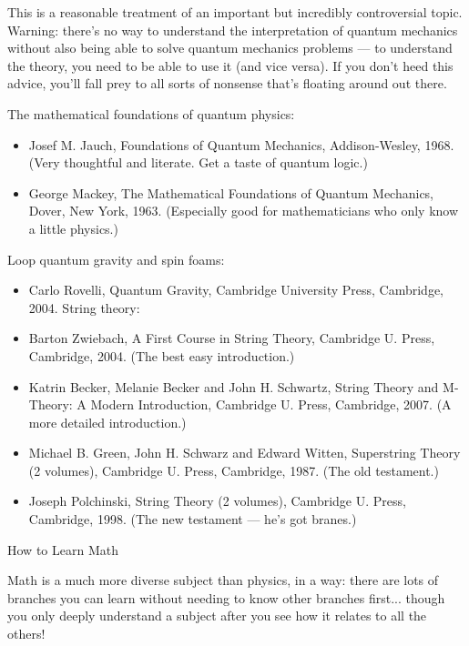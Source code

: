 \documentclass[10pt,a4paper]{book}
\theoremstyle{definition}
\begin{document}
This is a reasonable treatment of an important but incredibly controversial topic. Warning: there's no way to understand the interpretation of quantum mechanics without also being able to solve quantum mechanics problems — to understand the theory, you need to be able to use it (and vice versa). If you don't heed this advice, you'll fall prey to all sorts of nonsense that's floating around out there.

The mathematical foundations of quantum physics:

\begin{itemize}
\item Josef M. Jauch, Foundations of Quantum Mechanics, Addison-Wesley, 1968. (Very thoughtful and literate. Get a taste of quantum logic.)

\item George Mackey, The Mathematical Foundations of Quantum Mechanics, Dover, New York, 1963. (Especially good for mathematicians who only know a little physics.)
\end{itemize}

Loop quantum gravity and spin foams:

\begin{itemize}
\item Carlo Rovelli, Quantum Gravity, Cambridge University Press, Cambridge, 2004.
String theory:

\item Barton Zwiebach, A First Course in String Theory, Cambridge U. Press, Cambridge, 2004. (The best easy introduction.)

\item Katrin Becker, Melanie Becker and John H. Schwartz, String Theory and M-Theory: A Modern Introduction, Cambridge U. Press, Cambridge, 2007. (A more detailed introduction.)

\item Michael B. Green, John H. Schwarz and Edward Witten, Superstring Theory (2 volumes), Cambridge U. Press, Cambridge, 1987. (The old testament.)

\item Joseph Polchinski, String Theory (2 volumes), Cambridge U. Press, Cambridge, 1998. (The new testament — he's got branes.)
\end{itemize}

How to Learn Math

Math is a much more diverse subject than physics, in a way: there are lots of branches you can learn without needing to know other branches first... though you only deeply understand a subject after you see how it relates to all the others!
\end{document}
